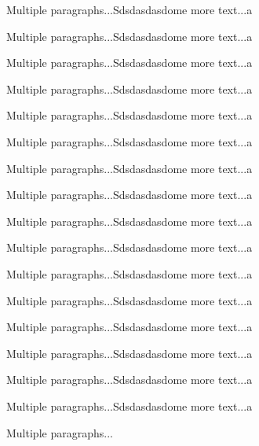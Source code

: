 \documentclass[doublespace,endnotes]{lingpaper}
\begin{document}
Multiple paragraphs...Sdsdasdasdome more text...a

Multiple paragraphs...Sdsdasdasdome more text...a

Multiple paragraphs...Sdsdasdasdome more text...a

Multiple paragraphs...Sdsdasdasdome more text...a

Multiple paragraphs...Sdsdasdasdome more text...a

Multiple paragraphs...Sdsdasdasdome more text...a

Multiple paragraphs...Sdsdasdasdome more text...a

Multiple paragraphs...Sdsdasdasdome more text...a

Multiple paragraphs...Sdsdasdasdome more text...a

Multiple paragraphs...Sdsdasdasdome more text...a

Multiple paragraphs...Sdsdasdasdome more text...a

Multiple paragraphs...Sdsdasdasdome more text...a

Multiple paragraphs...Sdsdasdasdome more text...a

Multiple paragraphs...Sdsdasdasdome more text...a

Multiple paragraphs...Sdsdasdasdome more text...a

Multiple paragraphs...Sdsdasdasdome more text...a

Multiple paragraphs...

\theendnotes
\end{document}
